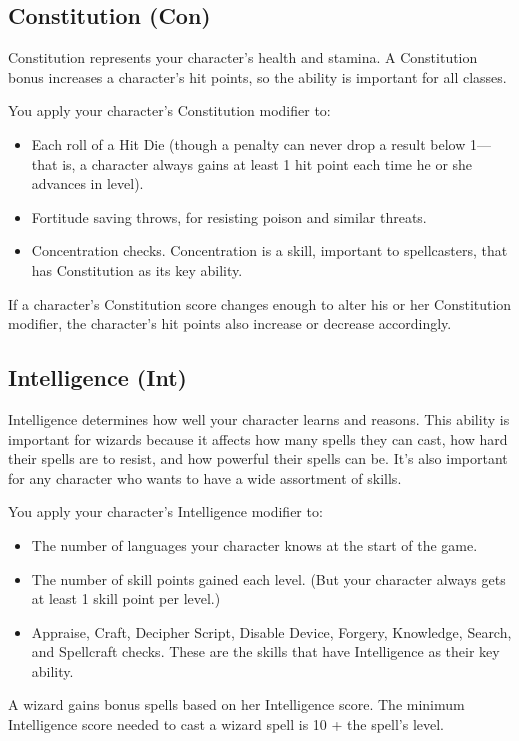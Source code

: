 \subsection{Constitution (Con)}
Constitution represents your character's health and stamina. A Constitution bonus increases a character's hit points, so the ability is important for all classes.

You apply your character's Constitution modifier to:
\begin{itemize}
\item Each roll of a Hit Die (though a penalty can never drop a result below 1---that is, a character always gains at least 1 hit point each time he or she advances in level).
\item Fortitude saving throws, for resisting poison and similar threats.
\item Concentration checks. Concentration is a skill, important to spellcasters, that has Constitution as its key ability.
\end{itemize}

If a character's Constitution score changes enough to alter his or her Constitution modifier, the character's hit points also increase or decrease accordingly.

\subsection{Intelligence (Int)}
Intelligence determines how well your character learns and reasons. This ability is important for wizards because it affects how many spells they can cast, how hard their spells are to resist, and how powerful their spells can be. It's also important for any character who wants to have a wide assortment of skills.

You apply your character's Intelligence modifier to:

\begin{itemize}
\item The number of languages your character knows at the start of the game.
\item The number of skill points gained each level. (But your character always gets at least 1 skill point per level.)
\item Appraise, Craft, Decipher Script, Disable Device, Forgery, Knowledge, Search, and Spellcraft checks. These are the skills that have Intelligence as their key ability.
\end{itemize}

A wizard gains bonus spells based on her Intelligence score. The minimum Intelligence score needed to cast a wizard spell is 10 + the spell's level.

